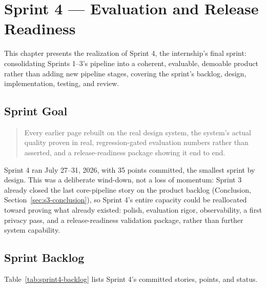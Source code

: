 \chapter{Sprint 4 --- Evaluation and Release Readiness}
\label{chap:sprint-4}

This chapter presents the realization of Sprint 4, the internship's
final sprint: consolidating Sprints 1--3's pipeline into a coherent,
evaluable, demoable product rather than adding new pipeline stages,
covering the sprint's backlog, design, implementation, testing, and
review.

\section{Sprint Goal}

\begin{quote}
Every earlier page rebuilt on the real design system, the system's
actual quality proven in real, regression-gated evaluation numbers
rather than asserted, and a release-readiness package showing it end to
end.
\end{quote}

Sprint 4 ran July 27--31, 2026, with 35 points committed, the smallest
sprint by design. This was a deliberate wind-down, not a loss of momentum:
Sprint 3 already closed the last core-pipeline story on the product
backlog (Conclusion, Section~\ref{sec:s3-conclusion}), so Sprint 4's entire
capacity could be reallocated toward proving what already existed:
polish, evaluation rigor, observability, a first privacy pass, and a
release-readiness validation package, rather than further system
capability.

\section{Sprint Backlog}

Table~\ref{tab:sprint4-backlog} lists Sprint 4's committed stories, points, and status.

